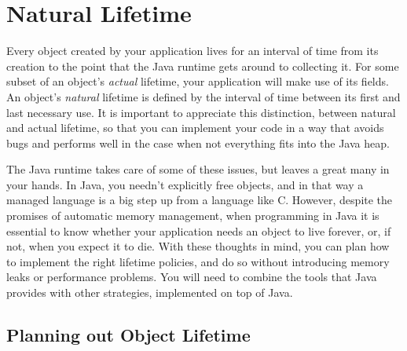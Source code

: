 \chapter{Natural Lifetime}

Every object created by your application lives for an interval of time from its
creation to the point that the Java runtime gets around to collecting it. For
some subset of an object's {\em actual} lifetime, your application will make use
of its fields. An object's {\em natural} lifetime is defined by the interval of
time between its first and last necessary use. %
It is important to appreciate this distinction, between natural and actual
lifetime, so that you can implement your code in a way that avoids bugs and
performs well in the case when not everything fits into the Java heap.

The Java runtime takes care of some of these issues, but leaves a great many in
your hands. In Java, you needn't explicitly free objects, and in that way a
managed language is a big step up from a language like C. However, despite the
promises of automatic memory management, when programming in Java it is essential
to know whether your  application needs an object to live forever, or, if not,
when you expect it to  die. With these thoughts in mind, you can plan how to
implement the right lifetime policies, and do so without introducing memory
leaks or performance  problems. You will need to combine the tools that Java
provides with other  strategies, implemented on top of Java.


\section{Planning out Object Lifetime}

